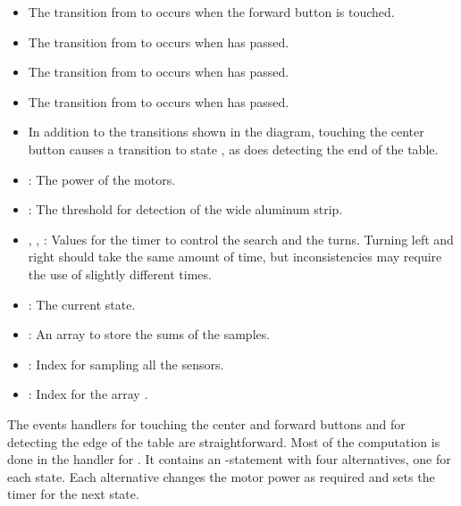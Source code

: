 \begin{itemize}

\item The transition from  to  occurs when
the forward button is touched.

\item The transition from  to  occurs
when  has passed.

\item The transition from  to  occurs
when  has passed.

\item The transition from  to  occurs
when  has passed.

\item In addition to the transitions shown in the diagram,
touching the center button causes a transition to state ,
as does detecting the end of the table.
\end{itemize}


\begin{itemize}

\item {}: The power of the motors.

\item {}: The threshold for detection of the wide aluminum strip.

\item {}, , : Values for
the timer to control the search and the turns.
Turning left and right should take the same amount of time,
but inconsistencies may require the use of slightly different times.

\end{itemize}


\begin{itemize}
\item {}: The current state. 
\item {}: An array to store the sums of the samples.
\item {}: Index for sampling all the sensors.
\item {}: Index for the array .
\end{itemize}


The events handlers for touching the center and forward buttons and for detecting
the edge of the table are straightforward. Most of the computation is done
in the handler for . It contains an -statement
with four alternatives, one for each state. Each alternative changes the
motor power as required and sets the timer for the next state.


